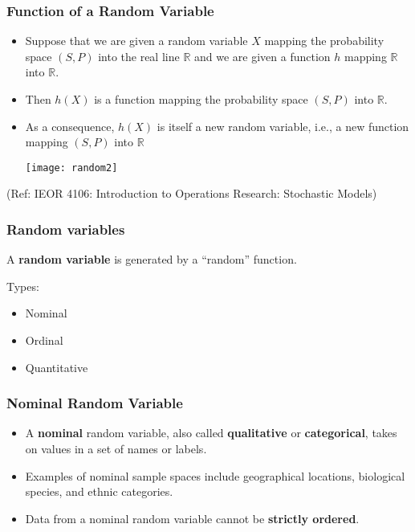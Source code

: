 \begin{frame}\frametitle{Function of a Random Variable}
\begin{itemize}

\item Suppose that we are given a random variable $X$ mapping
the probability space $(S, P)$ into the real line ${\mathbb R}$ and we are given a function $h$ mapping ${\mathbb R}$ into ${\mathbb R}$. 
\item Then $h(X)$ is a function mapping the probability space $(S, P)$ into ${\mathbb R}$. 
\item As a consequence, $h(X)$ is itself a new random variable, i.e., a new function mapping $(S, P)$ into ${\mathbb R}$

\begin{center}
\texttt{[image: random2]}
\end{center}


\end{itemize}

\tiny{(Ref: IEOR 4106: Introduction to Operations Research: Stochastic Models)}

\end{frame}



\begin{frame} \frametitle{Random variables}
A {\bf random variable} is generated by a ``random'' function. 

Types:
\begin{itemize}
\item Nominal
\item Ordinal
\item Quantitative
\end{itemize}
\end{frame}


\begin{frame}\frametitle{Nominal Random Variable}
\begin{itemize}
\item A {\bf nominal} random variable, also called {\bf qualitative} or {\bf  categorical}, takes on values in a set of names or labels.
\item Examples of nominal sample spaces include geographical locations, biological species, and ethnic categories.
\item Data from a nominal random variable cannot be {\bf strictly ordered}.
\end{itemize}
\end{frame}

